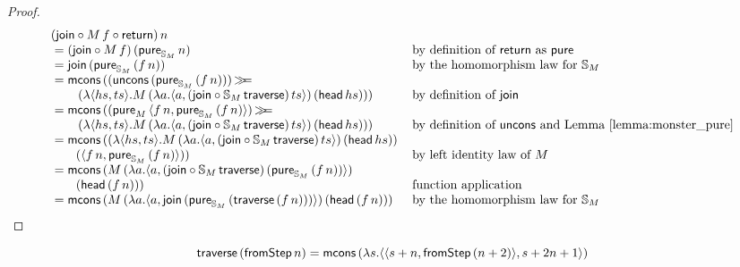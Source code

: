 \begin{proof}
$$
\begin{array}{ll}
(\join \comp  M\, f \comp \return)\, n \\
{}= (\join \comp  M\, f)\, (\apure_{\stream{M}}\, n)
  & \mbox{by definition of } \return \mbox{ as } \apure \\
{}= \join\, (\apure_{\stream{M}}\, (f \,n))
  & \mbox{by the homomorphism law for } \stream{M}\\
{}= \mcons\, ((\uncons\, (\apure_{\stream{M}}\, (f\, n)))\, \bind \\\qquad \,(\lambda \pair{hs}{ts} . M\,(\lambda a . \pair{a}{(\join \comp \stream{M}\,\mathsf{traverse})\, ts})\, (\head\, hs)))
  & \mbox{by definition of } \join \\
{}= \mcons\,((\apure_{M}\,\pair{f\, n}{\apure_{\stream{M}}\,(f\, n)})\, \bind \\\qquad \,(\lambda \pair{hs}{ts} . M\,(\lambda a . \pair{a}{(\join \comp \stream{M}\, \mathsf{traverse})\, ts})\, (\head\, hs)))
  & \mbox{by definition of } \uncons \mbox{ and Lemma \ref{lemma:monster_pure}}\\
{}= \mcons\, ((\lambda \pair{hs}{ts} . M\,(\lambda a . \pair{a}{(\join \comp \stream{M}\,\mathsf{traverse})\, ts})\, (\head\, hs)) \, \\\qquad (\pair{f\, n}{\apure_{\stream{M}}\,(f\, n)}))
  & \mbox{by left identity law of } M \\
{}= \mcons\,(M\,(\lambda a . \pair{a}{(\join \comp \stream{M}\,\mathsf{traverse})\, (\apure_{\stream{M}}\,(f\, n))})\, \\ \qquad (\head\, (f\, n)))
 & \mbox{function application} \\
 {}= \mcons\, (M\,(\lambda a . \pair{a}{\join\, (\apure_{\stream{M}}\, (\mathsf{traverse}\, (f\, n)))})\, (\head\, (f\, n)))
 & \mbox{by the homomorphism law for } \stream{M}\\

\end{array} 
$$
\end{proof}


\begin{lemmaa}{18}
$$
\mathsf{traverse}\, (\mathsf{fromStep}\, n) = \mathsf{mcons}\, (\lambda s . \langle \langle s+n, \mathsf{fromStep}\, (n + 2) \rangle, s + 2n + 1 \rangle)
$$
\end{lemmaa} 

